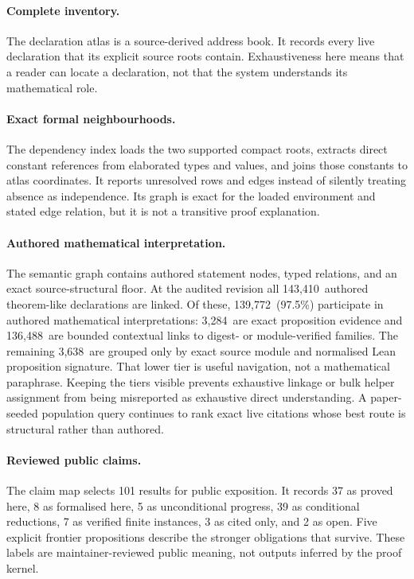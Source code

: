 \documentclass[11pt]{article}
\newcommand{\SemanticAuthoredTheoremLike}{143,410}
\newcommand{\SemanticAuthoredInterpreted}{139,772}
\newcommand{\SemanticDirectEvidence}{3,284}
\newcommand{\SemanticContextual}{136,488}
\newcommand{\SemanticStructuralOnly}{3,638}
\newcommand{\SemanticAuthoredPercent}{97.5}
\begin{document}
\paragraph{Complete inventory.}
The declaration atlas is a source-derived address book. It records every live
declaration that its explicit source roots contain. Exhaustiveness here means
that a reader can locate a declaration, not that the system understands its
mathematical role.

\paragraph{Exact formal neighbourhoods.}
The dependency index loads the two supported compact roots, extracts direct
constant references from elaborated types and values, and joins those
constants to atlas coordinates. It reports unresolved rows and edges instead
of silently treating absence as independence. Its graph is exact for the
loaded environment and stated edge relation, but it is not a transitive proof
explanation.

\paragraph{Authored mathematical interpretation.}
The semantic graph contains authored statement nodes, typed relations, and an
exact source-structural floor. At the audited revision all
\SemanticAuthoredTheoremLike\ authored theorem-like declarations are linked.
Of these, \SemanticAuthoredInterpreted\ (\SemanticAuthoredPercent\%) participate
in authored mathematical interpretations: \SemanticDirectEvidence\ are exact
proposition evidence and \SemanticContextual\ are bounded contextual links to
digest- or module-verified families. The remaining \SemanticStructuralOnly\ are grouped only by exact source
module and normalised Lean proposition signature. That lower tier is useful
navigation, not a mathematical paraphrase. Keeping the tiers visible prevents
exhaustive linkage or bulk helper assignment from being misreported as
exhaustive direct understanding. A paper-seeded population query continues to
rank exact live citations whose best route is structural rather than authored.

\paragraph{Reviewed public claims.}
The claim map selects 101 results for public exposition. It records 37 as
proved here, 8 as formalised here, 5 as unconditional progress, 39 as
conditional reductions, 7 as verified finite instances, 3 as cited only, and
2 as open. Five explicit frontier propositions describe the stronger
obligations that survive. These labels are maintainer-reviewed public meaning,
not outputs inferred by the proof kernel.
\end{document}

